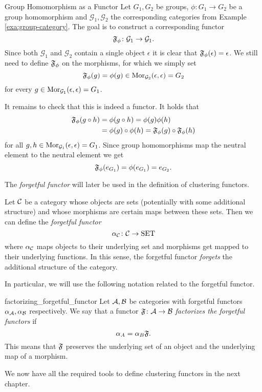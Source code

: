 \begin{example}{Group Homomorphism as a Functor}{}
Let $G_1, G_2$ be groups, $\phi\colon G_1 \to G_2$ be a group homomorphism and $\mathcal{G}_1,\mathcal{G}_2$ the corresponding categories from Example \ref{exa:group-category}. The goal is to construct a corresponding functor 
$$
\mathfrak{F}_\phi\colon \mathcal{G}_1 \to \mathcal{G}_1.
$$
Since both $\mathcal{G}_1$ and $\mathcal{G}_2$ contain a single object $\epsilon$ it is clear that $\mathfrak{F}_\phi(\epsilon) = \epsilon$. We still need to define $\mathfrak{F}_\phi$ on the morphisms, for which we simply set
$$
\mathfrak{F}_\phi(g) = \phi(g) \in \mathrm {Mor}_{\mathcal{G}_2}(\epsilon, \epsilon) = G_2
$$
for every $g \in \mathrm {Mor}_{\mathcal{G}_1}(\epsilon, \epsilon) = G_1$. \par

\medskip It remains to check that this is indeed a functor. It holds that
\begin{equation*}
\begin{split}
\mathfrak{F}_\phi(g \circ h) &= \phi(g \circ h) = \phi(g)\phi(h) \\
&= \phi(g) \circ \phi(h) = \mathfrak{F}_\phi(g) \circ \mathfrak{F}_\phi(h)
\end{split}
\end{equation*}
for all $g,h \in \mathrm {Mor}_{\mathcal{G}_1}(\epsilon, \epsilon) = G_1$. Since group homomorphisms map the neutral element to the neutral element we get
\begin{equation*}
\mathfrak{F}_\phi(e_{G_1}) = \phi(e_{G_1}) = e_{G_2}.
\end{equation*}
\end{example}

The \emph{forgetful functor} will later be used in the definition of clustering functors.

\begin{definition}{\cite[Chap.~1~Ex.~10]{Roman2017}}{}
Let $\mathcal{C}$ be a category whose objects are sets (potentially with some additional structure) and whose morphisms are certain maps between these sets. Then we can define the \emph{forgetful functor}
$$
\alpha_{\mathcal{C}}\colon \mathcal{C} \to \mathrm{SET}
$$
where $\alpha_{\mathcal{C}}$ maps objects to their underlying set and morphisms get mapped to their underlying functions. In this sense, the forgetful functor \emph{forgets} the additional structure of the category.
\end{definition}

In particular, we will use the following notation related to the forgetful functor.

\begin{notation}{}{factorizing_forgetful_functor}
Let $\mathcal{A}, \mathcal{B}$ be categories with forgetful functors $\alpha_{\mathcal{A}}, \alpha_{\mathcal{B}}$ respectively. We say that a functor $\mathfrak{F}\colon \mathcal{A} \to \mathcal{B}$ \emph{factorizes the forgetful functors} if
\begin{equation*}
    \alpha_A = \alpha_B \mathfrak{F}.
\end{equation*}
This means that $\mathfrak{F}$ preserves the underlying set of an object and the underlying map of a morphism.
\end{notation}

\medskip We now have all the required tools to define clustering functors in the next chapter.